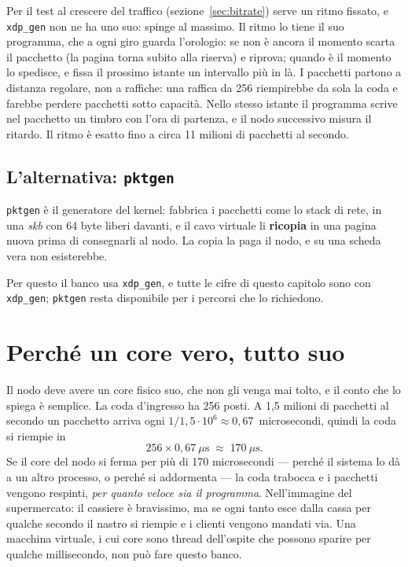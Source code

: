 \documentclass[11pt,a4paper,oneside]{report}
\begin{document}
Per il test al crescere del traffico (sezione~\ref{sec:bitrate}) serve un ritmo
fissato, e \texttt{xdp\_gen} non ne ha uno suo: spinge al massimo. Il ritmo lo
tiene il suo programma, che a ogni giro guarda l'orologio: se non è ancora il
momento scarta il pacchetto (la pagina torna subito alla riserva) e riprova;
quando è il momento lo spedisce, e fissa il prossimo istante un intervallo più in
là. I pacchetti partono a distanza regolare, non a raffiche: una raffica da 256
riempirebbe da sola la coda e farebbe perdere pacchetti sotto capacità. Nello
stesso istante il programma scrive nel pacchetto un timbro con l'ora di partenza,
e il nodo successivo misura il ritardo. Il ritmo è esatto fino a circa 11 milioni
di pacchetti al secondo.

\subsection*{L'alternativa: \texttt{pktgen}}

\texttt{pktgen} è il generatore del kernel: fabbrica i pacchetti come lo stack di
rete, in una \emph{skb} con 64 byte liberi davanti, e il cavo virtuale li
\textbf{ricopia} in una pagina nuova prima di consegnarli al nodo. La copia la
paga il nodo, e su una scheda vera non esisterebbe.

Per questo il banco usa \texttt{xdp\_gen}, e tutte le cifre di questo capitolo
sono con \texttt{xdp\_gen}; \texttt{pktgen} resta disponibile per i percorsi che lo
richiedono.

\section{Perché un core vero, tutto suo}

Il nodo deve avere un core fisico suo, che non gli venga mai tolto, e il conto
che lo spiega è semplice. La coda d'ingresso ha 256 posti. A 1,5 milioni di
pacchetti al secondo un pacchetto arriva ogni $1/1{,}5\cdot10^6 \approx
0{,}67$~microsecondi, quindi la coda si riempie in
\[
  256 \times 0{,}67~\mu\text{s} \;\approx\; 170~\mu\text{s} .
\]
Se il core del nodo si ferma per più di 170 microsecondi --- perché il sistema
lo dà a un altro processo, o perché si addormenta --- la coda trabocca e i
pacchetti vengono respinti, \emph{per quanto veloce sia il programma}.
Nell'immagine del supermercato: il cassiere è bravissimo, ma se ogni tanto esce
dalla cassa per qualche secondo il nastro si riempie e i clienti vengono mandati
via. Una macchina virtuale, i cui core sono thread dell'ospite che possono
sparire per qualche millisecondo, non può fare questo banco.
\end{document}
